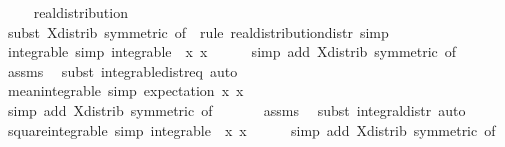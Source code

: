 \documentclass{svjour3}
\begin{document}
{\begin{isabellebody}
\ \ \isamarkupfalse%
\ {\isasymmu}{\isacharcolon}\ real{\isacharunderscore}distribution\ {\isasymmu}\isanewline
\ \ \ \ \isamarkupfalse%
\ {\isacharparenleft}subst\ X{\isacharunderscore}distrib\ {\isacharbrackleft}symmetric{\isacharcomma}\ of\ {}{\isacharbrackright}{\isacharcomma}\ rule\ real{\isacharunderscore}distribution{\isacharunderscore}distr{\isacharcomma}\ simp{\isacharparenright}\isanewline
\ \ \isanewline
\ \ \isamarkupfalse%
\ {\isasymmu}{\isacharunderscore}integrable\ {\isacharbrackleft}simp{\isacharbrackright}{\isacharcolon}\ {\isachardoublequoteopen}integrable\ {\isasymmu}\ {\isacharparenleft}{\isasymlambda}x{\isachardot}\ x{\isacharparenright}{\isachardoublequoteclose}\isanewline
\ \ \ \ \isamarkupfalse%
\ {\isacharparenleft}simp\ add{\isacharcolon}\ X{\isacharunderscore}distrib\ {\isacharbrackleft}symmetric{\isacharcomma}\ of\ {}{\isacharbrackright}{\isacharparenright}\isanewline
\ \ \ \ \isamarkupfalse%
\ assms\ \isamarkupfalse%
\ {\isacharparenleft}subst\ integrable{\isacharunderscore}distr{\isacharunderscore}eq{\isacharcomma}\ auto{\isacharparenright}\isanewline
\ \ \isamarkupfalse%
\ {\isasymmu}{\isacharunderscore}mean{\isacharunderscore}integrable\ {\isacharbrackleft}simp{\isacharbrackright}{\isacharcolon}\ {\isachardoublequoteopen}{\isasymmu}{\isachardot}expectation\ {\isacharparenleft}{\isasymlambda}x{\isachardot}\ x{\isacharparenright}\ {\isacharequal}\ {}{\isachardoublequoteclose}\isanewline
\ \ \ \ \isamarkupfalse%
\ {\isacharparenleft}simp\ add{\isacharcolon}\ X{\isacharunderscore}distrib\ {\isacharbrackleft}symmetric{\isacharcomma}\ of\ {}{\isacharbrackright}{\isacharparenright}\isanewline
\ \ \ \ \isamarkupfalse%
\ assms\ \isamarkupfalse%
\ {\isacharparenleft}subst\ integral{\isacharunderscore}distr{\isacharcomma}\ auto{\isacharparenright}\isanewline
\ \ \isamarkupfalse%
\ {\isasymmu}{\isacharunderscore}square{\isacharunderscore}integrable\ {\isacharbrackleft}simp{\isacharbrackright}{\isacharcolon}\ {\isachardoublequoteopen}integrable\ {\isasymmu}\ {\isacharparenleft}{\isasymlambda}x{\isachardot}\ x{\isacharcircum}{}{\isacharparenright}{\isachardoublequoteclose}\isanewline
\ \ \ \ \isamarkupfalse%
\ {\isacharparenleft}simp\ add{\isacharcolon}\ X{\isacharunderscore}distrib\ {\isacharbrackleft}symmetric{\isacharcomma}\ of\ {}{\isacharbrackright}{\isacharparenright}\isanewline

\end{isabellebody}}
\end{document}
